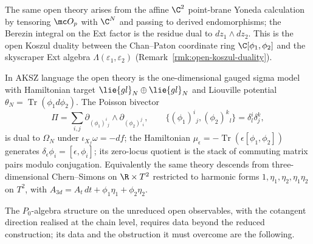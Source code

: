 \documentclass[11pt]{memoir}
\begin{document}
\begin{rmk}
  The same open theory arises from the affine \(\C^2\) point-brane
  Yoneda calculation by tensoring \(\mc O_p\) with \(\C^N\) and
  passing to derived endomorphisms; the Berezin integral on the Ext
  factor is the residue dual to \(dz_1\wedge dz_2\). This is the open
  Koszul duality between the Chan--Paton coordinate
  ring \(\C[\phi_1,\phi_2]\) and the skyscraper Ext algebra
  \(\Lambda(\varepsilon_1,\varepsilon_2)\)
  (Remark~\ref{rmk:open-koszul-duality}).
\end{rmk}

\begin{rmk}
  In AKSZ language the open theory is the one-dimensional gauged
  sigma model with Hamiltonian target
  \(\lie{gl}_N\oplus\lie{gl}_N\) and Liouville potential
  \(\theta_N=\operatorname{Tr}(\phi_1d\phi_2)\). The Poisson bivector
  \[
    \Pi=\sum_{i,j}\partial_{(\phi_1)^i{}_j}\wedge
      \partial_{(\phi_2)^j{}_i},\qquad
    \{(\phi_1)^i{}_j,(\phi_2)^k{}_l\}=\delta^i_l\delta^k_j,
  \]
  is dual to \(\Omega_N\) under \(\iota_{X_f}\omega=-df\); the
  Hamiltonian
  \(\mu_\epsilon=-\operatorname{Tr}(\epsilon[\phi_1,\phi_2])\)
  generates \(\delta_\epsilon\phi_i=[\epsilon,\phi_i]\); its
  zero-locus quotient is the stack of commuting matrix pairs modulo
  conjugation. Equivalently the same theory descends from
  three-dimensional Chern--Simons on \(\R\times T^2\) restricted to
  harmonic forms \(1,\eta_1,\eta_2,\eta_1\eta_2\) on \(T^2\), with
  \(A_{3d}=A_t\,dt+\phi_1\eta_1+\phi_2\eta_2\).
\end{rmk}

The \(P_0\)-algebra structure on the unreduced open observables, with
the cotangent direction realised at the chain level, requires data
beyond the reduced construction; its data and the obstruction it must
overcome are the following.
\end{document}
